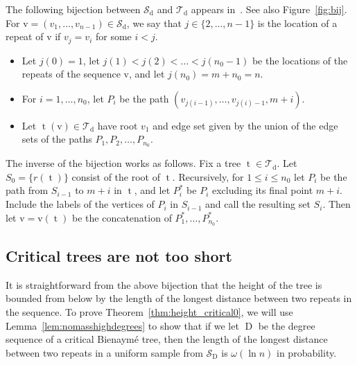 \documentclass[10pt]{amsart}
\theoremstyle{definition}
\numberwithin{figure}{section}
\newcommand{\sequence}[1]{\mathrm{#1}}
\DeclareMathOperator{\tree}{t}
\DeclareMathOperator{\dseq}{d}
\DeclareMathOperator{\Dseq}{D}
\newcommand\cS{\mathcal{S}}
\newcommand\cT{\mathcal{T}}
\begin{document}
The following bijection between $\cS_{\dseq}$ and $\cT_{\dseq}$ appears in~\cite[Section~3]{cayley_us}. See also Figure~\ref{fig:bij}. For $\sequence{v}=(v_1,\dots, v_{n-1}) \in \cS_{\dseq}$, we say that $j\in \{2,\dots, n-1\}$ is the location of a repeat of $\sequence{v}$ if $v_j=v_i$ for some $i<j$.
\begin{tcolorbox}[title=Bijection $\tree$ between $\cS_{\dseq}$ and $\cT_{\dseq}$.]
\begin{itemize}
\item Let $j(0)=1$, let $j(1)<j(2)<\dots<j(n_0-1)$ be the locations of the repeats of the sequence $\sequence{v}$, and let $j(n_0)=m+n_0=n$.
\item For $i=1,\dots, n_0$, let $P_i$ be the path $(v_{j(i-1)}, \dots, v_{j(i)-1}, m+i)$.
\item Let $\tree(\sequence{v}) \in \cT_{\dseq}$ have root $v_1$ and edge set given by the union of the edge sets of the paths $P_1, P_2, \dots, P_{n_0}$.
\end{itemize}
\end{tcolorbox}
The inverse of the bijection works as follows. Fix a tree $\tree \in \cT_{\dseq}$. Let $S_0 = \{r(\tree)\}$ consist of the root of $\tree$. Recursively, for $1 \le i \le n_0$ let $P_i$ be the path from $S_{i-1}$ to $m+i$ in $\tree$, and let $P_i^*$ be $P_i$ excluding its final point $m+i$. Include the labels of the vertices of $P_i$ in $S_{i-1}$ and call the resulting set $S_i$. Then let $\sequence{v}=\sequence{v}(\tree)$ be the concatenation of $P_1^*,\ldots,P_{n_0}^*$.




\subsection{Critical trees are not too short}

It is straightforward from the above bijection that the height of the tree is bounded from below by the length of the longest distance between two repeats in the sequence. To prove Theorem~\ref{thm:height_critical0}, we will use Lemma~\ref{lem:nomasshighdegrees} to show that if we let $\Dseq $ be the degree sequence of a critical Bienaymé tree, then the length of the longest distance between two repeats in a uniform sample from $\cS_{\Dseq}$ is $\omega(\ln n)$ in probability.
\end{document}
